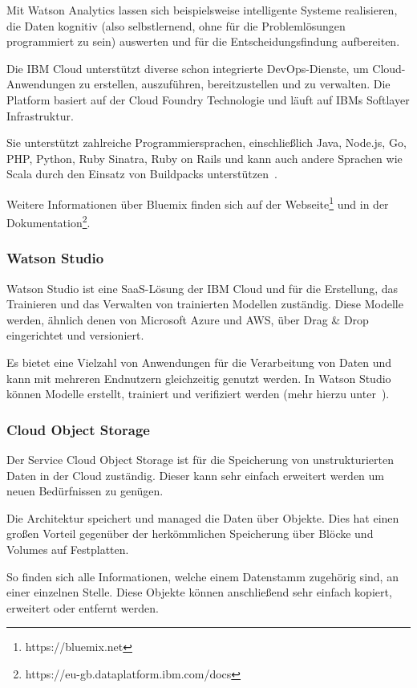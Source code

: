 Mit Watson Analytics lassen sich beispielsweise intelligente Systeme realisieren, die Daten kognitiv (also selbstlernend,
ohne für die Problemlösungen programmiert zu sein) auswerten und für die Entscheidungsfindung aufbereiten.

Die IBM Cloud unterstützt diverse schon integrierte DevOps-Dienste, um Cloud-Anwendungen zu erstellen, auszuführen,
bereitzustellen und zu verwalten. Die Platform basiert auf der Cloud Foundry Technologie und läuft auf IBMs
Softlayer Infrastruktur.

Sie unterstützt zahlreiche Programmiersprachen, einschließlich Java, Node.js, Go, PHP, Python, Ruby Sinatra, Ruby on
Rails und kann auch andere Sprachen wie Scala durch den Einsatz von Buildpacks
unterstützen~\cite{book_grundlagen_bluemix}.

Weitere Informationen über Bluemix finden sich auf der Webseite\footnote{https://bluemix.net} und in der
Dokumentation\footnote{https://eu-gb.dataplatform.ibm.com/docs}.

\subsubsection{Watson Studio}
Watson Studio ist eine SaaS-Lösung der IBM Cloud und für die Erstellung, das Trainieren und das Verwalten von
trainierten Modellen zuständig. Diese Modelle werden, ähnlich denen von Microsoft Azure und AWS, über Drag \& Drop
eingerichtet und versioniert.

Es bietet eine Vielzahl von Anwendungen für die Verarbeitung von Daten und kann mit mehreren Endnutzern gleichzeitig
genutzt werden. In Watson Studio können Modelle erstellt, trainiert und verifiziert werden (mehr hierzu
unter~\cite{online_grundlagen_watson_studio}).

\subsubsection{Cloud Object Storage}
Der Service Cloud Object Storage ist für die Speicherung von unstrukturierten Daten in der Cloud zuständig. Dieser kann
sehr einfach erweitert werden um neuen Bedürfnissen zu genügen.

Die Architektur speichert und managed die Daten über Objekte. Dies hat einen großen Vorteil gegenüber der herkömmlichen
Speicherung über Blöcke und Volumes auf Festplatten.

So finden sich alle Informationen, welche einem Datenstamm zugehörig sind, an einer einzelnen Stelle. Diese Objekte
können anschließend sehr einfach kopiert, erweitert oder entfernt werden.

